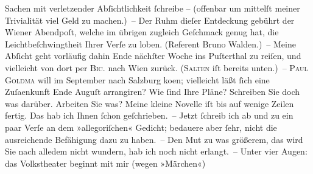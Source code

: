 \begin{ledgroupsized}[t]{13cm}
               Sachen mit verletzender Abſichtlichkeit ſchreibe – (offenbar um mittelſt meiner
               Trivialität viel Geld zu machen.) – Der Ruhm dieſer Entdeckung gebührt der Wiener Abendpoſt, welche im übrigen zugleich
               Geſchmack genug hat, die Leichtbeſchwingtheit Ihrer Verſe zu loben. (Referent Bruno Walden.) –\pend
           \pstart
           Meine Abſicht geht vorläufig dahin {\pb}Ende nächſter Woche
               ins Puſterthal zu reiſen, und vielleicht von dort
               per \textsc{Bic.} nach Wien zurück.
                  (\textsc{Salten} iſt bereits unten.) – \textsc{Paul Goldma{\geminationn}} will im September nach Salzburg
                  ko{\geminationm}en; vielleicht läßt ſich eine Zuſa{\geminationm}enkunft Ende Auguſt arrangiren?\pend
           \pstart
           Wie ſind Ihre Pläne? Schreiben Sie doch was darüber. Arbeiten Sie was? Meine kleine
                  Novelle iſt bis auf wenige Zeilen fertig. {\pb}Das hab ich Ihnen ſchon geſchrieben. – Jetzt ſchreib ich
               ab und zu ein paar Verſe an dem »allegoriſchen« Gedicht; bedauere aber ſehr, nicht die ausreichende Befähigung dazu zu
               haben. –\pend
           \pstart
           Den Mut zu was größerem, das wird Sie nach alledem nicht wundern, hab ich noch nicht
               erlangt. – Unter vier Augen: das Volkstheater beginnt
               mit mir \introOben{}(wegen »Märchen«)\introOben{}

\end{ledgroupsized}
